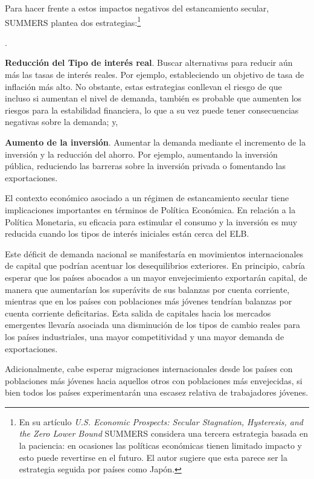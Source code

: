 \documentclass[10pt,a4paper]{article}
\newcounter{numitem}
\newenvironment{lnum}
      {\begin{list}{\arabic{numitem}.}{%
          \usecounter{numitem}%
          \setlength{\leftmargin}{1cm}%
          \setlength{\parskip}{3pt}%
          \setlength{\itemsep}{0pt}%
          \setlength{\parsep}{0pt}%
      }}
      {\end{list}}
\begin{document}
Para hacer frente a estos impactos negativos del estancamiento secular, SUMMERS plantea dos estrategias:\footnote{
  En su artículo \textit{U.S. Economic Prospects: Secular Stagnation, Hysteresis, and the Zero Lower Bound} SUMMERS considera una tercera estrategia basada en la paciencia: en ocasiones las políticas económicas tienen limitado impacto y esto puede revertirse en el futuro. El autor sugiere que esta parece ser la estrategia seguida por países como Japón.
} 
\begin{lnum}
    \item \textbf{Reducción del Tipo de interés real}. Buscar alternativas para reducir aún más las tasas de interés reales. Por ejemplo, estableciendo un objetivo de tasa de inflación más alto. No obstante, estas estrategias conllevan el riesgo de que incluso si aumentan el nivel de demanda, también es probable que aumenten los riesgos para la estabilidad financiera, lo que a su vez puede tener consecuencias negativas sobre la demanda; y, 
    \item \textbf{Aumento de la inversión}. Aumentar la demanda mediante el incremento de la inversión y la reducción del ahorro. Por ejemplo, aumentando la inversión pública, reduciendo las barreras sobre la inversión privada o fomentando las exportaciones.
\end{lnum}

El contexto económico asociado a un régimen de estancamiento secular tiene implicaciones importantes en términos de Política Económica. En relación a la Política Monetaria, su eficacia para estimular el consumo y la inversión es muy reducida cuando los tipos de interés iniciales están cerca del ELB. 

Este déficit de demanda nacional se manifestaría en movimientos internacionales de capital que podrían acentuar los desequilibrios exteriores. En principio, cabría esperar que los países abocados a un mayor envejecimiento exportarán capital, de manera que aumentarían los superávits de sus balanzas por cuenta corriente, mientras que en los países con poblaciones más jóvenes tendrían balanzas por cuenta corriente deficitarias. Esta salida de capitales hacia los mercados emergentes llevaría asociada una disminución de los tipos de cambio reales para los países industriales, una mayor competitividad y una mayor demanda de exportaciones. 

Adicionalmente, cabe esperar migraciones internacionales desde los países con poblaciones más jóvenes hacia aquellos otros con poblaciones más envejecidas, si bien todos los países experimentarán una escasez relativa de trabajadores jóvenes.
\end{document}
